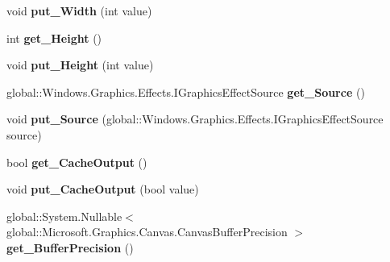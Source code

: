 \begin{DoxyCompactItemize}
void {\bfseries put\+\_\+\+Width} (int value)
\item 
\mbox{\label{class_microsoft_1_1_graphics_1_1_canvas_1_1_effects_1_1_morphology_effect_abcfe446fe92397d1c11d0b6227c48e3e}} 
int {\bfseries get\+\_\+\+Height} ()
\item 
\mbox{\label{class_microsoft_1_1_graphics_1_1_canvas_1_1_effects_1_1_morphology_effect_a8952cddc9fba06db55a0f9b692f3a53d}} 
void {\bfseries put\+\_\+\+Height} (int value)
\item 
\mbox{\label{class_microsoft_1_1_graphics_1_1_canvas_1_1_effects_1_1_morphology_effect_a3a2a845c602a6a0210a1eec2fde425ce}} 
global\+::\+Windows.\+Graphics.\+Effects.\+I\+Graphics\+Effect\+Source {\bfseries get\+\_\+\+Source} ()
\item 
\mbox{\label{class_microsoft_1_1_graphics_1_1_canvas_1_1_effects_1_1_morphology_effect_ae949c76c82e06342011eb1752f181098}} 
void {\bfseries put\+\_\+\+Source} (global\+::\+Windows.\+Graphics.\+Effects.\+I\+Graphics\+Effect\+Source source)
\item 
\mbox{\label{class_microsoft_1_1_graphics_1_1_canvas_1_1_effects_1_1_morphology_effect_a77f71f5925758effa265f4eeeb2f6f4a}} 
bool {\bfseries get\+\_\+\+Cache\+Output} ()
\item 
\mbox{\label{class_microsoft_1_1_graphics_1_1_canvas_1_1_effects_1_1_morphology_effect_ad7cedb874a08fef65c195124455c9138}} 
void {\bfseries put\+\_\+\+Cache\+Output} (bool value)
\item 
\mbox{\label{class_microsoft_1_1_graphics_1_1_canvas_1_1_effects_1_1_morphology_effect_a35ea5c10eb956a33432ecf7e5554f786}} 
global\+::\+System.\+Nullable$<$ global\+::\+Microsoft.\+Graphics.\+Canvas.\+Canvas\+Buffer\+Precision $>$ {\bfseries get\+\_\+\+Buffer\+Precision} ()

\end{DoxyCompactItemize}

